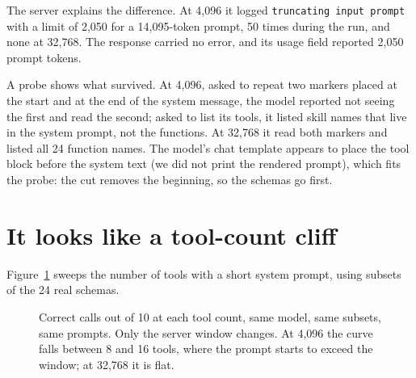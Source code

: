 \documentclass[10pt]{article}
\begin{document}
The server explains the difference. At 4,096 it logged \texttt{truncating input prompt} with a limit of 2,050 for a 14,095-token prompt, 50 times during the run, and none at 32,768. The response carried no error, and its usage field reported 2,050 prompt tokens.

A probe shows what survived. At 4,096, asked to repeat two markers placed at the start and at the end of the system message, the model reported not seeing the first and read the second; asked to list its tools, it listed skill names that live in the system prompt, not the functions. At 32,768 it read both markers and listed all 24 function names. The model's chat template appears to place the tool block before the system text (we did not print the rendered prompt), which fits the probe: the cut removes the beginning, so the schemas go first.

\section{It looks like a tool-count cliff}

Figure~\ref{fig:sweep} sweeps the number of tools with a short system prompt, using subsets of the 24 real schemas.

\begin{figure}[H]
\centering
{}
\caption{Correct calls out of 10 at each tool count, same model, same subsets, same prompts. Only the server window changes. At 4,096 the curve falls between 8 and 16 tools, where the prompt starts to exceed the window; at 32,768 it is flat.}
\label{fig:sweep}
\end{figure}
\end{document}
